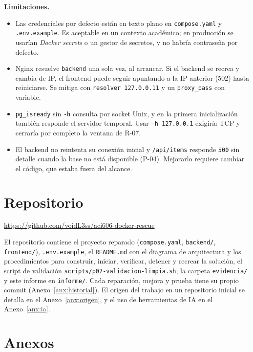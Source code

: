 \documentclass[11pt,a4paper]{article}
\newcommand{\repourl}{https://github.com/voidL3ss/aci606-docker-rescue}
\newcommand{\cod}[1]{\texttt{#1}}
\begin{document}
\textbf{Limitaciones.}
\begin{itemize}
  \item Las credenciales por defecto están en texto plano en \cod{compose.yaml} y \cod{.env.example}. Es aceptable en un contexto académico; en producción se usarían \emph{Docker secrets} o un gestor de secretos, y no habría contraseña por defecto.
  \item Nginx resuelve \cod{backend} una sola vez, al arrancar. Si el backend se recrea y cambia de IP, el frontend puede seguir apuntando a la IP anterior (502) hasta reiniciarse. Se mitiga con \cod{resolver 127.0.0.11} y un \cod{proxy\_pass} con variable.
  \item \cod{pg\_isready} sin \cod{-h} consulta por socket Unix, y en la primera inicialización también responde el servidor temporal. Usar \cod{-h 127.0.0.1} exigiría TCP y cerraría por completo la ventana de R-07.
  \item El backend no reintenta su conexión inicial y \cod{/api/items} responde \cod{500} sin detalle cuando la base no está disponible (P-04). Mejorarlo requiere cambiar el código, que estaba fuera del alcance.
\end{itemize}

\section{Repositorio}

\begin{center}
\large\url{\repourl}
\end{center}

El repositorio contiene el proyecto reparado (\cod{compose.yaml}, \cod{backend/}, \cod{frontend/}), \cod{.env.example}, el \cod{README.md} con el diagrama de arquitectura y los procedimientos para construir, iniciar, verificar, detener y recrear la solución, el script de validación \cod{scripts/p07-validacion-limpia.sh}, la carpeta \cod{evidencia/} y este informe en \cod{informe/}. Cada reparación, mejora y prueba tiene su propio commit (Anexo~\ref{anx:historial}). El origen del trabajo en un repositorio inicial se detalla en el Anexo~\ref{anx:origen}, y el uso de herramientas de IA en el Anexo~\ref{anx:ia}.

\clearpage
\appendix
\section{Anexos}
\end{document}
